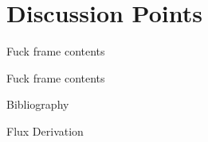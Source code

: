 \documentclass[aspectratio=169,  notheorems, sOuRcEs]{RUCPresentation}
\begin{document}
%
%
%



\section{ Discussion Points }
\begin{frame}{Fuck}
    frame contents
\end{frame}


\begin{frame}{Fuck}
    frame contents
\end{frame}


\begin{frame}{Bibliography}



\end{frame}





\appendix

\begin{frame}{ Flux Derivation }



\end{frame}
\end{document}
